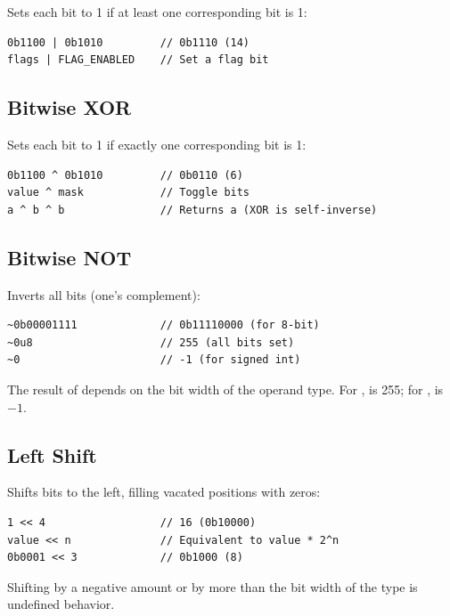 Sets each bit to 1 if at least one corresponding bit is 1:

\begin{lstlisting}
0b1100 | 0b1010         // 0b1110 (14)
flags | FLAG_ENABLED    // Set a flag bit
\end{lstlisting}

\subsection{Bitwise XOR}

Sets each bit to 1 if exactly one corresponding bit is 1:

\begin{lstlisting}
0b1100 ^ 0b1010         // 0b0110 (6)
value ^ mask            // Toggle bits
a ^ b ^ b               // Returns a (XOR is self-inverse)
\end{lstlisting}

\subsection{Bitwise NOT}

Inverts all bits (one's complement):

\begin{lstlisting}
~0b00001111             // 0b11110000 (for 8-bit)
~0u8                    // 255 (all bits set)
~0                      // -1 (for signed int)
\end{lstlisting}

\begin{warning}
The result of \code{\~{}} depends on the bit width of the operand type. For ,  is 255; for ,  is $-1$.
\end{warning}

\subsection{Left Shift}

Shifts bits to the left, filling vacated positions with zeros:

\begin{lstlisting}
1 << 4                  // 16 (0b10000)
value << n              // Equivalent to value * 2^n
0b0001 << 3             // 0b1000 (8)
\end{lstlisting}

\begin{warning}
Shifting by a negative amount or by more than the bit width of the type is undefined behavior.
\end{warning}

